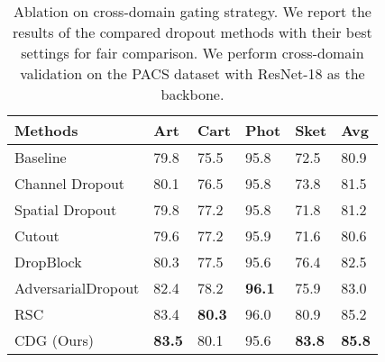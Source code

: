 \begin{table}[htb]
  \caption{Ablation on cross-domain gating strategy. We report the results of the compared dropout methods with their best settings for fair comparison. We perform cross-domain validation on the PACS dataset with ResNet-18 as the backbone. }
  \label{tab:dropout}
  \begin{center}
    \begin{tabularx}{0.5\textwidth}{p{}<{\centering}|X<{\centering}|X<{\centering}|X<{\centering}|X<{\centering}|X<{\centering}}

      \toprule[0.6pt]
      Methods                                     & Art           & Cart       & Phot & Sket        & Avg           \\
      \midrule[0.4pt]
      Baseline                                    & 79.8          & 75.5          & 95.8  & 72.5          & 80.9          \\
      Channel Dropout                             & 80.1          & 76.5          & 95.8  & 73.8          & 81.5          \\
      Spatial Dropout  & 79.8          & 77.2          & 95.8  & 71.8          & 81.2          \\
      Cutout            & 79.6          & 77.2          & 95.9  & 71.6          & 80.6          \\
      DropBlock         & 80.3          & 77.5          & 95.6  & 76.4          & 82.5          \\
      AdversarialDropout & 82.4      & 78.2    & \textbf{96.1}      & 75.9    & 83.0 \\
      RSC                      & 83.4          & \textbf{80.3} & 96.0  & 80.9          & 85.2          \\
      \midrule[0.2pt]
      CDG (Ours)                                        & \textbf{83.5} & 80.1          & 95.6  & \textbf{83.8} & \textbf{85.8} \\

      \bottomrule[0.6pt]
    \end{tabularx}
  \end{center}
\end{table}

